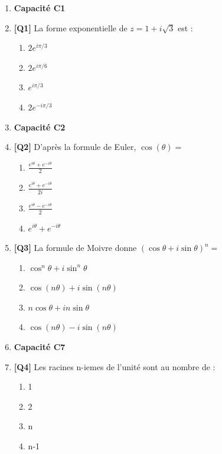\begin{enumerate}

\item[] \textbf{Capacité C1}

\item \textbf{[Q1]} La forme exponentielle de $z = 1 + i\sqrt{3}$ est :
  \begin{enumerate}[label=\Alph*.]
    \item $2e^{i\pi/3}$
    \item $2e^{i\pi/6}$
    \item $e^{i\pi/3}$
    \item $2e^{-i\pi/3}$
  \end{enumerate}

\item[] \textbf{Capacité C2}

\item \textbf{[Q2]} D'après la formule de Euler, $\cos(\theta) =$
  \begin{enumerate}[label=\Alph*.]
    \item $\frac{e^{i\theta} + e^{-i\theta}}{2}$
    \item $\frac{e^{i\theta} + e^{-i\theta}}{2i}$
    \item $\frac{e^{i\theta} - e^{-i\theta}}{2}$
    \item $e^{i\theta} + e^{-i\theta}$
  \end{enumerate}

\item \textbf{[Q3]} La formule de Moivre donne $(\cos\theta + i\sin\theta)^n =$
  \begin{enumerate}[label=\Alph*.]
    \item $\cos^n\theta + i\sin^n\theta$
    \item $\cos(n\theta) + i\sin(n\theta)$
    \item $n\cos\theta + in\sin\theta$
    \item $\cos(n\theta) - i\sin(n\theta)$
  \end{enumerate}

\item[] \textbf{Capacité C7}

\item \textbf{[Q4]} Les racines n-iemes de l'unité sont au nombre de :
  \begin{enumerate}[label=\Alph*.]
    \item 1
    \item 2
    \item n
    \item n-1
  \end{enumerate}


\end{enumerate}
